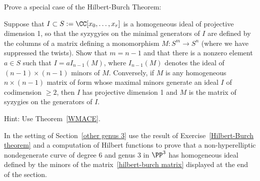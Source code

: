 \begin{exercise}\label{Hilbert-Burch theorem}
 Prove a special case of the Hilbert-Burch Theorem:
 
\begin{theorem}
 Suppose that $I \subset S:=\CC[x_{0},\dots, x_{r}]$ is a homogeneous ideal of projective dimension 1, so that the syzygyies on the minimal generators of $I$
 are defined by the columns of a matrix defining a monomorphism
 $ M: S^{m} \to S^{n}$ (where we have suppressed the twists). Show that $m = n-1$ and that there is a nonzero element $a\in S$ such that $I = aI_{n-1}(M)$,
 where $I_{n-1}(M)$ denotes the ideal of $(n-1)\times (n-1)$ minors of $M$. Conversely, if $M$ is any homogeneous
 $n\times (n-1)$ matrix of form whose maximal minors generate an ideal $I$ of codimension $\geq 2$, then
 $I$ has projective dimension 1 and $M$ is the matrix of syzygies on the generators of $I$. 
\end{theorem}
Hint: Use Theorem~\ref{WMACE}. 
\end{exercise}

\begin{exercise} \label{leftover from Ch 5}
 In the setting of Section~\ref{other genus 3} use the result of Exercise~\ref{Hilbert-Burch theorem} and a computation
 of Hilbert functions  to prove that
 a non-hyperelliptic nondegenerate curve of degree 6 and genus 3 in $\PP^{3}$ has homogeneous ideal
 defined by the minors of the matrix~\ref{hilbert-burch matrix} displayed at the end of the section.
\end{exercise}


%
%
%
%
